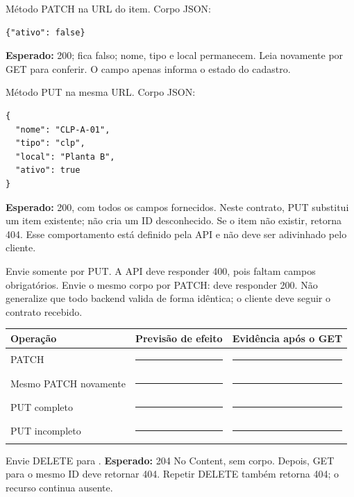 Método PATCH na URL do item. Corpo JSON:
\begin{lstlisting}
{"ativo": false}
\end{lstlisting}
\textbf{Esperado:} 200;  fica falso; nome, tipo e local permanecem. Leia novamente por GET para conferir. O campo apenas informa o estado do cadastro.

Método PUT na mesma URL. Corpo JSON:
\begin{lstlisting}
{
  "nome": "CLP-A-01",
  "tipo": "clp",
  "local": "Planta B",
  "ativo": true
}
\end{lstlisting}
\textbf{Esperado:} 200, com todos os campos fornecidos. Neste contrato, PUT substitui um item existente; não cria um ID desconhecido. Se o item não existir, retorna 404. Esse comportamento está definido pela API e não deve ser adivinhado pelo cliente.

Envie somente  por PUT. A API deve responder 400, pois faltam campos obrigatórios. Envie o mesmo corpo por PATCH: deve responder 200. Não generalize que todo backend valida de forma idêntica; o cliente deve seguir o contrato recebido.

\begin{tabularx}{\linewidth}{@{}lYY@{}}\toprule
Operação & Previsão de efeito & Evidência após o GET \\\midrule
PATCH  & \rule{2.8cm}{0.2pt} & \rule{3cm}{0.2pt}\\
Mesmo PATCH novamente & \rule{2.8cm}{0.2pt} & \rule{3cm}{0.2pt}\\
PUT completo & \rule{2.8cm}{0.2pt} & \rule{3cm}{0.2pt}\\
PUT incompleto & \rule{2.8cm}{0.2pt} & \rule{3cm}{0.2pt}\\\bottomrule
\end{tabularx}


Envie DELETE para . \textbf{Esperado:} 204 No Content, sem corpo. Depois, GET para o mesmo ID deve retornar 404. Repetir DELETE também retorna 404; o recurso continua ausente.

